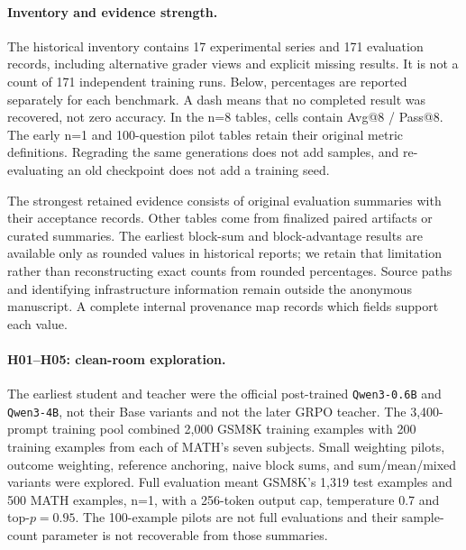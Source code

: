 \paragraph{Inventory and evidence strength.}
The historical inventory contains 17 experimental series and 171 evaluation records, including alternative grader views and explicit missing results. It is not a count of 171 independent training runs. Below, percentages are reported separately for each benchmark. A dash means that no completed result was recovered, not zero accuracy. In the n=8 tables, cells contain Avg@8 / Pass@8. The early n=1 and 100-question pilot tables retain their original metric definitions. Regrading the same generations does not add samples, and re-evaluating an old checkpoint does not add a training seed.

The strongest retained evidence consists of original evaluation summaries with their acceptance records. Other tables come from finalized paired artifacts or curated summaries. The earliest block-sum and block-advantage results are available only as rounded values in historical reports; we retain that limitation rather than reconstructing exact counts from rounded percentages. Source paths and identifying infrastructure information remain outside the anonymous manuscript. A complete internal provenance map records which fields support each value.

\paragraph{H01--H05: clean-room exploration.}
The earliest student and teacher were the official post-trained \texttt{Qwen3-0.6B} and \texttt{Qwen3-4B}, not their Base variants and not the later GRPO teacher. The 3,400-prompt training pool combined 2,000 GSM8K training examples with 200 training examples from each of MATH's seven subjects. Small weighting pilots, outcome weighting, reference anchoring, naive block sums, and sum/mean/mixed variants were explored. Full evaluation meant GSM8K's 1,319 test examples and 500 MATH examples, n=1, with a 256-token output cap, temperature 0.7 and top-$p=0.95$. The 100-example pilots are not full evaluations and their sample-count parameter is not recoverable from those summaries.

